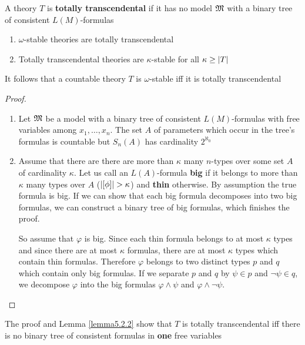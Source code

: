 \documentclass[11pt]{article}
\begin{document}
\begin{definition}[]
A theory \(T\) is \textbf{totally transcendental} if it has no model \(\mathfrak{M}\) with a binary tree of
consistent \(L(M)\)-formulas
\end{definition}

\begin{theorem}[]
\label{thm5.2.6}
\begin{enumerate}
\item \(\omega\)-stable theories are totally transcendental
\item Totally transcendental theories are \(\kappa\)-stable for all \(\kappa\ge\abs{T}\)
\end{enumerate}
\end{theorem}

It follows that a countable theory \(T\) is \(\omega\)-stable iff it is totally transcendental

\begin{proof}
\begin{enumerate}
\item Let \(\mathfrak{M}\) be a model with a binary tree of consistent \(L(M)\)-formulas with free variables
among \(x_1,\dots,x_n\). The set \(A\) of parameters which occur in the tree's formulas is
countable but \(S_n(A)\) has cardinality \(2^{\aleph_0}\)
\item Assume that there are there are more than \(\kappa\) many \(n\)-types over some set \(A\) of
cardinality \(\kappa\). Let us call an \(L(A)\)-formula \textbf{big} if it belongs to more than \(\kappa\) many types
over \(A\) (\(\abs{[\phi]}>\kappa\)) and \textbf{thin} otherwise. By assumption the true formula is big. If we
can show that each big formula decomposes into two big formulas, we can construct a binary
tree of big formulas, which finishes the proof.

So assume that \(\varphi\) is big. Since each thin formula belongs to at most \(\kappa\) types and since there
are at most \(\kappa\) formulas, there are at most \(\kappa\) types which contain thin formulas. Therefore
\(\varphi\) belongs to two distinct types \(p\) and \(q\) which contain only big formulas. If we
separate \(p\) and \(q\) by \(\psi\in p\) and \(\neg\psi\in q\), we decompose \(\varphi\) into the big
formulas \(\varphi\wedge\psi\) and \(\varphi\wedge\neg\psi\).
\end{enumerate}
\end{proof}

The proof and Lemma \ref{lemma5.2.2} show that \(T\) is totally transcendental iff there is no
binary tree of consistent formulas in \textbf{one} free variables
\end{document}
